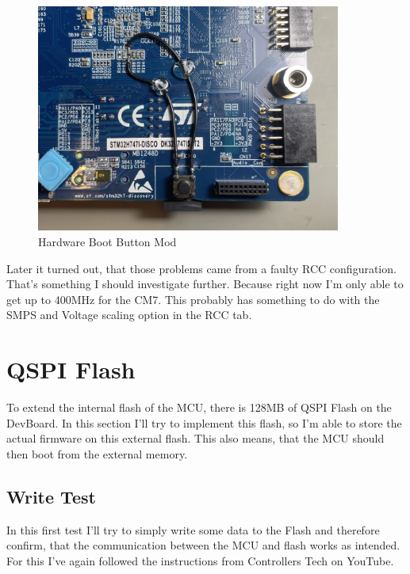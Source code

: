 \begin{figure}[H]
	\centering
	\includegraphics[width=10cm]{Resources/HW_Boot_MOD.JPEG}
	\caption{Hardware Boot Button Mod}
	\label{fig:Hardware Boot Button Mod}
\end{figure}

Later it turned out, that those problems came from a faulty RCC configuration. That's something I should investigate further. Because right now I'm only able to get up to 400MHz for the CM7. This probably has something to do with the SMPS and Voltage scaling option in the RCC tab.

\section{QSPI Flash}
To extend the internal flash of the MCU, there is 128MB of QSPI Flash on the DevBoard. In this section I'll try to implement this flash, so I'm able to store the actual firmware on this external flash. This also means, that the MCU should then boot from the external memory.

\subsection{Write Test}
In this first test I'll try to simply write some data to the Flash and therefore confirm, that the communication between the MCU and flash works as intended. For this I've again followed the instructions from Controllers Tech on YouTube. 
\cite{YT_CT_QSPI}

